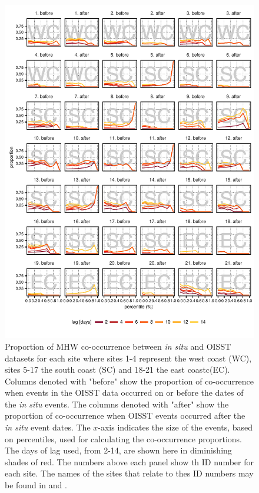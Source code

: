 \documentclass[a4paper,10pt,review]{elsarticle}
\begin{document}
\begin{figure}
\includegraphics[width=1.0\textwidth]{figure4.pdf}
\caption{Proportion of MHW co-occurrence between \emph{in situ} and OISST datasets for each site where sites 1-4 represent the west coast (WC), sites 5-17 the south coast (SC) and 18-21 the east coastc(EC). Columns denoted with "before" show the proportion of co-occurrence when events in the OISST data occurred on or before the dates of the \emph{in situ} events. The columns denoted with "after" show the proportion of co-occurrence when OISST events occurred after the \emph{in situ} event dates. The $x$-axis indicates the size of the events, based on percentiles, used for calculating the co-occurrence proportions. The days of lag used, from 2-14, are shown here in diminishing shades of red. The numbers above each panel show th ID number for each site. The names of the sites that relate to thes ID numbers may be found in  and .}
\label{fig:Figure4}
\end{figure}
\end{document}
